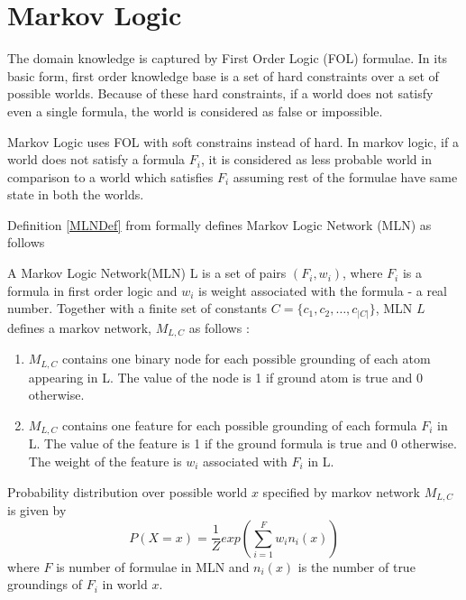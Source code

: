 \section{Markov Logic}
The domain knowledge is captured by First Order Logic (FOL) formulae. In its basic form, 
first order knowledge base is a set of hard constraints over a set of possible worlds.
Because of these hard constraints, if a world does not satisfy even a single formula,
the world is considered as false or impossible.

Markov Logic uses FOL with soft constrains instead of hard. In markov logic, if a world
does not satisfy a formula $F_i$, it is considered as less probable world in comparison to a
world which satisfies $F_i$ assuming rest of the formulae have same state in both the worlds.

Definition \ref{MLNDef} from \cite{MarkovLogic} formally defines 
Markov Logic Network (MLN) as follows

\begin{defn}
	\label{MLNDef}
	A Markov Logic Network(MLN) L is a set of pairs $(F_i, w_i)$, where $F_i$ is a
	formula in first order logic and $w_i$ is weight associated with the formula - a real number.
	Together with a finite set of constants $C = \{c_1, c_2,\ldots,c_{|C|}\}$, MLN $L$
	defines a markov network, $M_{L,C}$ as follows :

	\begin{enumerate}
		\item $M_{L,C}$ contains one binary node for each possible grounding
			of each atom appearing in L. The value of the node is 1 if ground
			atom is true and 0 otherwise.
		\item $M_{L,C}$ contains one feature for each possible grounding of each
			formula $F_i$ in L. The value of the feature is 1 if the ground
			formula is true and 0 otherwise. The weight of the feature is
			$w_i$ associated with $F_i$ in L.
	\end{enumerate}
\end{defn}

Probability distribution over possible world $x$ specified by markov network $M_{L,C}$ is given by
\begin{equation}
	\label{jointDistMLN}
	P(X = x) = \frac{1}{Z} exp \left( \displaystyle \sum_{i = 1}^{F} w_i n_i(x)  \right)
\end{equation}
where $F$ is number of formulae in MLN and $n_i(x)$ is the number of true groundings of
$F_i$ in world $x$.



